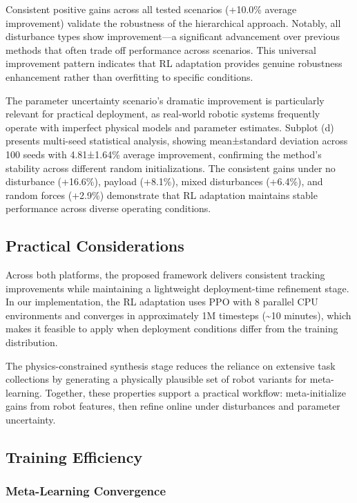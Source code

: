 \documentclass[DTMColor]{ROB-New}
\begin{document}
Consistent positive gains across all tested scenarios (+10.0\% average improvement) validate the robustness of the hierarchical approach. Notably, all disturbance types show improvement—a significant advancement over previous methods that often trade off performance across scenarios. This universal improvement pattern indicates that RL adaptation provides genuine robustness enhancement rather than overfitting to specific conditions. 

The parameter uncertainty scenario's dramatic improvement is particularly relevant for practical deployment, as real-world robotic systems frequently operate with imperfect physical models and parameter estimates. Subplot (d) presents multi-seed statistical analysis, showing mean±standard deviation across 100 seeds with 4.81±1.64\% average improvement, confirming the method's stability across different random initializations. The consistent gains under no disturbance (+16.6\%), payload (+8.1\%), mixed disturbances (+6.4\%), and random forces (+2.9\%) demonstrate that RL adaptation maintains stable performance across diverse operating conditions.

\FloatBarrier
\subsection{Practical Considerations}

Across both platforms, the proposed framework delivers consistent tracking improvements while maintaining a lightweight deployment-time refinement stage. In our implementation, the RL adaptation uses PPO with 8 parallel CPU environments and converges in approximately 1M timesteps (\textasciitilde10 minutes), which makes it feasible to apply when deployment conditions differ from the training distribution.

The physics-constrained synthesis stage reduces the reliance on extensive task collections by generating a physically plausible set of robot variants for meta-learning. Together, these properties support a practical workflow: meta-initialize gains from robot features, then refine online under disturbances and parameter uncertainty.

\FloatBarrier

\subsection{Training Efficiency}

\subsubsection{Meta-Learning Convergence}
\end{document}
